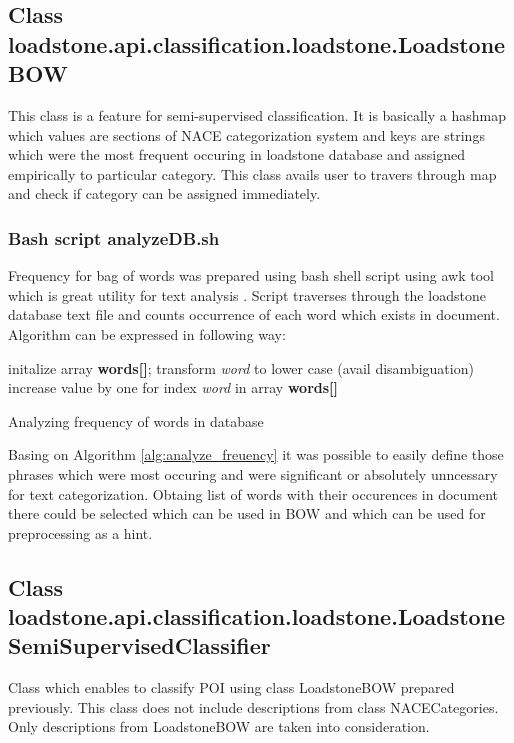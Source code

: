 \subsection{Class loadstone.api.classification.loadstone.LoadstoneBOW}
This class is a feature for semi-supervised classification. It is basically a hashmap which values are sections of NACE categorization system and keys are strings which were the most frequent occuring in loadstone database and assigned empirically to particular category. This class avails user to travers through map and check if category can be assigned immediately. 
\subsubsection{Bash script analyzeDB.sh}
Frequency for bag of words was prepared using bash shell script using awk tool which is great utility for text analysis \cite{21}. Script traverses through the loadstone database text file and counts occurrence of each word which exists in document. Algorithm can be expressed in following way:
\begin{algorithm}[h]
	initalize array \textbf{words[]};
	\newline
	{
		transform \textit{word} to lower case (avail disambiguation)
		\newline
		increase value by one for index \textit{word} in array \textbf{words[]} 
	}
\caption{Analyzing frequency of words in database}\label{alg:analyze_freuency}
\end{algorithm}

Basing on Algorithm \ref{alg:analyze_freuency} it was possible to easily define those phrases which were most occuring and were significant or absolutely unncessary for text categorization. Obtaing list of words with their occurences in document there could be selected which can be used in BOW and which can be used for preprocessing as a hint.

\subsection{Class loadstone.api.classification.loadstone.LoadstoneSemiSupervisedClassifier}
Class which enables to classify POI using class LoadstoneBOW prepared previously. This class does not include descriptions from class NACECategories. Only descriptions from LoadstoneBOW are taken into consideration.

